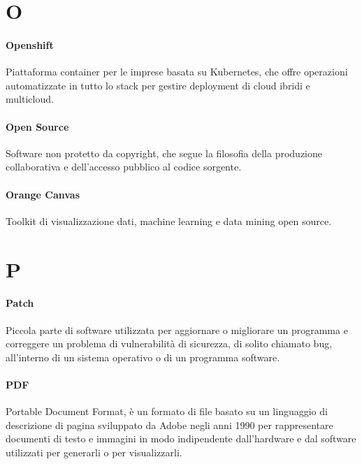 \documentclass[]{article}
\begin{document}
	\newpage
	
	\section*{O}
	
	\paragraph*{Openshift}
	Piattaforma container per le imprese basata su Kubernetes, che offre operazioni automatizzate in tutto lo stack per gestire deployment di cloud ibridi e multicloud.
	
	\paragraph*{Open Source}
	Software non protetto da copyright, che segue la filosofia della produzione collaborativa e dell'accesso pubblico al codice sorgente.
	
	\paragraph*{Orange Canvas}
	Toolkit di visualizzazione dati, machine learning e data mining open source.
	
	\newpage
	
	\section*{P}
	
	\paragraph*{Patch}
	Piccola parte di software utilizzata per aggiornare o migliorare un programma e correggere un problema di vulnerabilità di sicurezza, di solito chiamato bug, all'interno di un sistema operativo o di un programma software.
	
	\paragraph*{PDF}
	Portable Document Format, è un formato di file basato su un linguaggio di descrizione di pagina sviluppato da Adobe negli anni 1990 per rappresentare documenti di testo e immagini in modo indipendente dall'hardware e dal software utilizzati per generarli o per visualizzarli.
	
\end{document}
